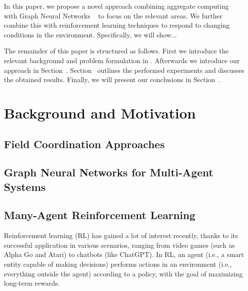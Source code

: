 \documentclass[conference]{IEEEtran}
\begin{document}
In this paper, we propose a novel approach combining aggregate computing
~\cite{Beal2015Computer} with Graph Neural Networks
~\cite{Zhou2020AIOpen} to focus on the relevant areas. We further combine this with reinforcement learning techniques to respond to changing conditions in the environment.
Specifically, we will show... 

The remainder of this paper is structured as follows. First we introduce the relevant background and problem formulation in . Afterwards we introduce our approach in Section~. Section~ outlines the performed experiments and discusses the obtained results. Finally, we will present our conclusions in Section~.


\section{Background and Motivation}
\label{sec:background}
\subsection{Field Coordination Approaches}
\subsection{Graph Neural Networks for Multi-Agent Systems}
\subsection{Many-Agent Reinforcement Learning}

Reinforcement learning (RL) has gained a lot of interest recently, 
 thanks to its successful application in various scenarios, 
 ranging from video games (such as Alpha Go and Atari) 
 to chatbots (like ChatGPT). 
% 
In RL, an agent (i.e., a smart entity capable of making decisions) 
 performs actions in an environment (i.e., everything outside the agent) according to a policy, 
 with the goal of maximizing long-term rewards.
\end{document}
